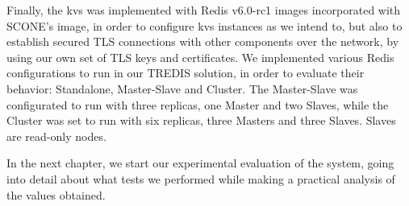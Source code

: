 Finally, the \gls{kvs} was implemented with Redis v6.0-rc1 images incorporated with SCONE's image, in order to configure \gls{kvs} instances as we intend to, but also to establish secured TLS connections with other components over the network, by using our own set of TLS keys and certificates. We implemented various Redis configurations to run in our TREDIS solution, in order to evaluate their behavior: Standalone, Master-Slave and Cluster. The Master-Slave was configurated to run with three replicas, one Master and two Slaves, while the Cluster was set to run with six replicas, three Masters and three Slaves. Slaves are read-only nodes.

In the next chapter, we start our experimental evaluation of the system, going into detail about what tests we performed while making a practical analysis of the values obtained.





